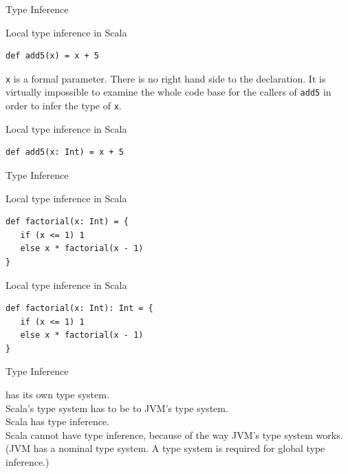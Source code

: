 \begin{frame}[fragile]{Type Inference}
\begin{alertblock}{Local type inference in Scala}
\begin{lstlisting}
def add5(x) = x + 5
\end{lstlisting}
\end{alertblock}
\pause
\lstinline!x! is a formal parameter. There is no right hand side to the
declaration. It is virtually impossible to examine the whole code base for the
callers of \lstinline!add5! in order to infer the type of \lstinline!x!.
\pause
\begin{exampleblock}{Local type inference in Scala}
\begin{lstlisting}
def add5(x: Int) = x + 5
\end{lstlisting}
\end{exampleblock}
\end{frame}

\begin{frame}[fragile]{Type Inference}
\begin{alertblock}{Local type inference in Scala}
\begin{lstlisting}
def factorial(x: Int) = {
   if (x <= 1) 1
   else x * factorial(x - 1)
}
\end{lstlisting}
\end{alertblock}
\pause
\begin{exampleblock}{Local type inference in Scala}
\begin{lstlisting}
def factorial(x: Int): Int = {
   if (x <= 1) 1
   else x * factorial(x - 1)
}
\end{lstlisting}
\end{exampleblock}
\end{frame}

\begin{frame}{Type Inference}
\begin{center}
 has its own type system.\\
Scala's type system has to be  to JVM's type system.\\
Scala has  type inference.\\
Scala \alert{cannot have}  type inference, because of the way
JVM's type system works. (JVM has a \alert{nominal} type system. A
 type system is required for global type inference.)
\end{center}
\end{frame}

